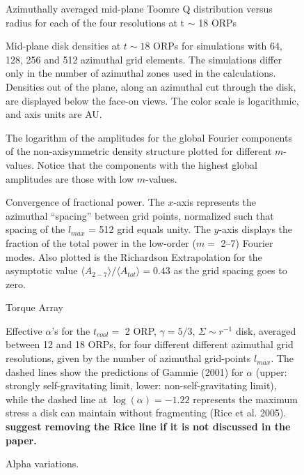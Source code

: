 \documentclass[manuscript]{aastex}
\begin{document}
\begin{figure}
\caption{Azimuthally averaged mid-plane Toomre Q distribution versus radius for each of the four resolutions at t $\sim$ 18 ORPs}
\label{fig:Final_Q}
\end{figure}

\begin{figure}
\caption
{
Mid-plane disk densities at $t \sim 18$ ORPs for simulations with 64, 128, 256 and 512 azimuthal grid elements.
The simulations differ only in the number of  azimuthal zones used in the calculations.  Densities out of the plane, along an azimuthal cut through the disk, are displayed below the face-on views.  The color scale is logarithmic, and axis units are AU. 
}
\label{fig:DensityPlots}
\end{figure}
\newpage

\begin{figure}
\caption
{
The logarithm of the amplitudes for the global Fourier components of the non-axisymmetric density structure plotted for different $m$-values. Notice that the components with the highest global amplitudes are those with low $m$-values.  
}
\label{fig:Am_vs_log_m}
\end{figure}

\begin{figure}
\caption
{
Convergence of fractional power.  The $x$-axis represents
the azimuthal ``spacing'' between grid points,  normalized such that spacing of the $l_{max}$ = 512 grid
equals unity.
The $y$-axis displays the fraction of the total power in the low-order ($m = $ 2--7) Fourier modes. 
Also plotted is the Richardson Extrapolation for the asymptotic value  
$\langle A_{2-7} \rangle / \langle A_{tot} \rangle = 0.43$ as the grid spacing goes to zero.  
}
\label{fig:Power_Extrap}
\end{figure}

\begin{figure}
\caption
{
Torque Array}
\label{fig:torquearray}
\end{figure}


\begin{figure}
\label{fig:alpha_v_radius}
\caption
{Effective $\alpha$'s for the $t_{cool} =$ 2 ORP, $\gamma = 5/3$, $\Sigma \sim r^{ -1}$ disk, averaged between 12 and 18 ORPs, for four different different azimuthal grid resolutions, given by the number of azimuthal grid-points $l_{max}$. The dashed lines show the predictions of Gammie (2001) for $\alpha$ (upper: strongly self-gravitating limit, lower: non-self-gravitating limit), while the dashed line at $\log(\alpha) = -1.22$ represents the maximum stress a disk can maintain without fragmenting (Rice et al. 2005). {\bf suggest removing the Rice line if it is not discussed in the paper.} 
}
\end{figure}
\newpage

\begin{figure}
\caption
{Alpha variations.}
\label{fig:alphavar}
\end{figure}
\end{document}
